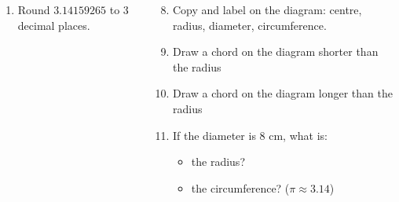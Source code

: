 \documentclass{beamer}
\newcommand{\ashow}[1]{\uncover<2->{\textcolor{red}{\small #1}}}
\begin{document}
\begin{frame}
\begin{columns}
\small
\begin{enumerate}
  \item Round $3.14159265$ to 3 decimal places. \ashow{3.142}
\end{enumerate}
\vspace{-0.5em}
\begin{enumerate}
  \setcounter{enumi}{7}
  \item Copy and label on the diagram: 
    centre, radius, diameter, circumference.
    \item Draw a chord on the diagram shorter than the radius
    \item Draw a chord on the diagram longer than the radius
  
  \item If the diameter is $8$ cm, what is:
    \begin{itemize}
      \item the radius? \ashow{$4$ cm}
      \item the circumference? ($\pi \approx 3.14$) \ashow{$25.12$ cm}
    \end{itemize}
 
\end{enumerate}

\end{columns}
\end{frame}
\end{document}
